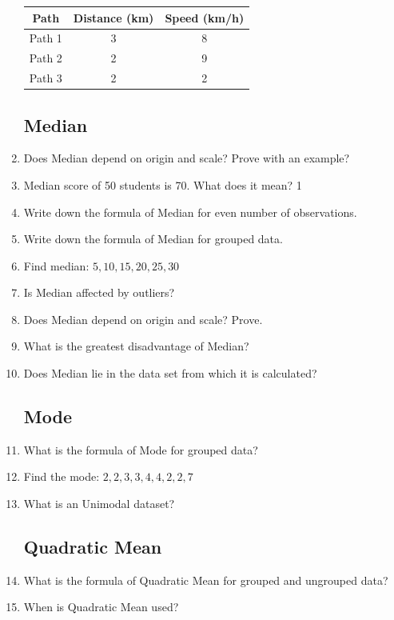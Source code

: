 \documentclass[a4paper,oneside]{book}
\begin{document}
\begin{enumerate}
    \begin{table}[h]
    \centering
\begin{tabular}{c|c|c}
Path   & Distance (km) & Speed (km/h) \\ \hline
Path 1 & 3             & 8            \\ \hline 
Path 2 & 2             & 9            \\ \hline
Path 3 & 2             & 2           
\end{tabular}
\end{table}

\subsection{Median}

    \item Does Median depend on origin and scale? Prove with an example?
    \item Median score of 50 students is 70. What does it mean? \hfill 1
    \item Write down the formula of Median for even number of observations.
    \item Write down the formula of Median for grouped data.
    \item Find median: $5,10, 15, 20, 25, 30$
    \item Is Median affected by outliers?
    \item Does Median depend on origin and scale? Prove.
    \item What is the greatest disadvantage of Median?
    \item Does Median lie in the data set from which it is calculated?
    
\subsection{Mode}

    \item What is the formula of Mode for grouped data?
    \item Find the mode: $2,2,3,3,4,4,2,2,7$
    \item What is an Unimodal dataset?

\subsection{Quadratic Mean}

    \item What is the formula of Quadratic Mean for grouped and ungrouped data?
    \item When is Quadratic Mean used?


\end{enumerate}
\end{document}
